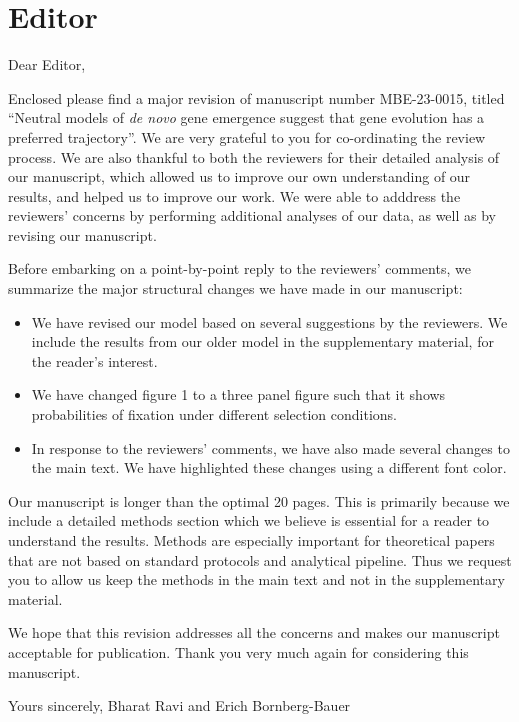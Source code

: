 \documentclass[12pt,a4paper]{article}
\begin{document}
\onehalfspacing 

\section*{Editor}

Dear Editor,

Enclosed please find a major revision of manuscript number MBE-23-0015, titled ``Neutral models of \textit{de novo} gene emergence suggest that gene evolution has a preferred trajectory''. We are very grateful to you for co-ordinating the review process. We are also thankful to both the reviewers for their detailed analysis of our manuscript, which allowed us to improve our own understanding of our results, and helped us to improve our work. We were able to adddress the reviewers' concerns by performing additional analyses of our data, as well as by revising our manuscript. 

Before embarking on a point-by-point reply to the reviewers' comments, we summarize the major structural changes we have made in our manuscript:

\begin{itemize}
\item We have revised our model based on several suggestions by the reviewers. We include the results from our older model in the supplementary material, for the reader's interest. 
\item We have changed figure 1 to a three panel figure such that it shows probabilities of fixation under different selection conditions.
\item In response to the reviewers' comments, we have also made several changes to the main text. We have highlighted these changes using a different font color.
\end{itemize}

Our manuscript is longer than the optimal 20 pages. This is primarily because we include a detailed methods section which we believe is essential for a reader to understand the results. Methods are especially important for theoretical papers that are not based on standard protocols and analytical pipeline. Thus we request you to allow us keep the methods in the main text and not in the supplementary material.

We hope that this revision addresses all the concerns and makes our manuscript acceptable for publication. Thank you very much again for considering this manuscript.

Yours sincerely,
Bharat Ravi and Erich Bornberg-Bauer
\end{document}
